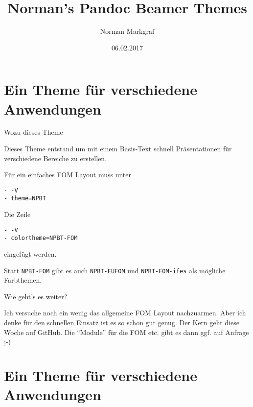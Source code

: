 \documentclass[10pt,ngerman,a4paper,ignorenonframetext,]{beamer}
\title{Norman's Pandoc Beamer Themes}
\author{Norman Markgraf}
\institute{Sefiroth Consulting}
\date{06.02.2017}
\begin{document}
\frame{\titlepage}

\hypertarget{ein-theme-fur-verschiedene-anwendungen}{%
\section{Ein Theme für verschiedene
Anwendungen}\label{ein-theme-fur-verschiedene-anwendungen}}

\begin{frame}[fragile]{Wozu dieses Theme}
\protect\hypertarget{wozu-dieses-theme}{}

Dieses Theme entstand um mit einem Basis-Text schnell Präsentationen für
verschiedene Bereiche zu erstellen.

Für ein einfaches FOM Layout muss unter

\begin{verbatim}
- -V
- theme=NPBT
\end{verbatim}

Die Zeile

\begin{verbatim}
- -V
- colortheme=NPBT-FOM
\end{verbatim}

eingefügt werden.

Statt \texttt{NPBT-FOM} gibt es auch \texttt{NPBT-EUFOM} und
\texttt{NPBT-FOM-ifes} als mögliche Farbthemen.

\end{frame}

\begin{frame}{Wie geht's es weiter?}
\protect\hypertarget{wie-gehts-es-weiter}{}

Ich versuche noch ein wenig das allgemeine FOM Layout nachzuarmen. Aber
ich denke für den schnellen Einsatz ist es so schon gut genug. Der Kern
geht diese Woche auf GitHub. Die ``Module'' für die FOM etc. gibt es
dann ggf. auf Anfrage ;-)

\end{frame}

\hypertarget{ein-theme-fur-verschiedene-anwendungen-1}{%
\section{Ein Theme für verschiedene
Anwendungen}\label{ein-theme-fur-verschiedene-anwendungen-1}}
\end{document}
